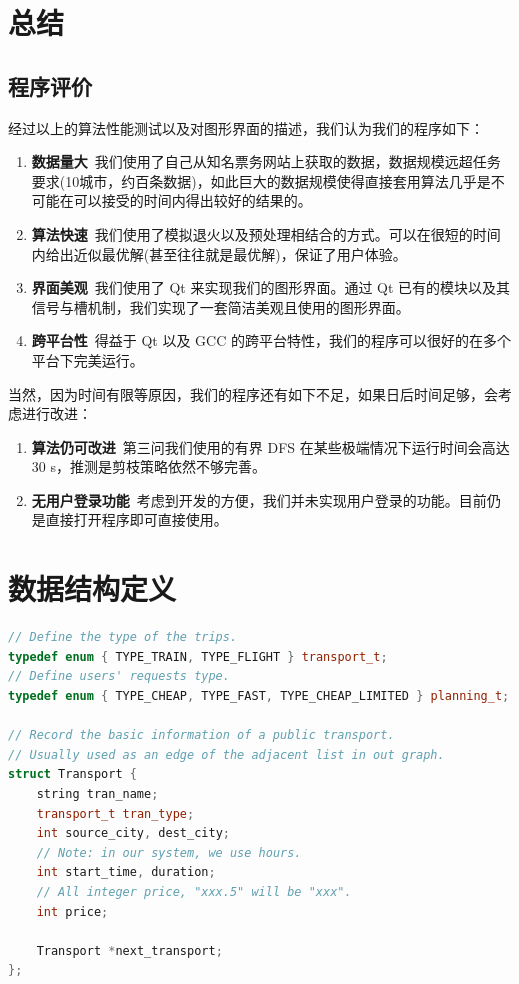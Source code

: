 \documentclass[lang=cn,blue]{elegantbook}
\begin{document}
\chapter{总结}

\section{程序评价}
经过以上的算法性能测试以及对图形界面的描述，我们认为我们的程序如下：

\begin{enumerate}
	\item \textbf{数据量大}\ 我们使用了自己从知名票务网站上获取的数据，数据规模远超任务要求(10城市，约百条数据)，如此巨大的数据规模使得直接套用算法几乎是不可能在可以接受的时间内得出较好的结果的。
	\item \textbf{算法快速}\ 我们使用了模拟退火以及预处理相结合的方式。可以在很短的时间内给出近似最优解(甚至往往就是最优解)，保证了用户体验。
	\item \textbf{界面美观}\ 我们使用了 Qt 来实现我们的图形界面。通过 Qt 已有的模块以及其信号与槽机制，我们实现了一套简洁美观且使用的图形界面。
	\item \textbf{跨平台性}\ 得益于 Qt 以及 GCC 的跨平台特性，我们的程序可以很好的在多个平台下完美运行。
\end{enumerate}

当然，因为时间有限等原因，我们的程序还有如下不足，如果日后时间足够，会考虑进行改进：

\begin{enumerate}
	\item \textbf{算法仍可改进}\ 第三问我们使用的有界 DFS 在某些极端情况下运行时间会高达 30 s，推测是剪枝策略依然不够完善。
	\item \textbf{无用户登录功能}\ 考虑到开发的方便，我们并未实现用户登录的功能。目前仍是直接打开程序即可直接使用。
\end{enumerate}

\appendix
\chapter{数据结构定义}

\begin{lstlisting}[language=C++,caption={Transport 的定义},captionpos=b]
// Define the type of the trips.
typedef enum { TYPE_TRAIN, TYPE_FLIGHT } transport_t;
// Define users' requests type.
typedef enum { TYPE_CHEAP, TYPE_FAST, TYPE_CHEAP_LIMITED } planning_t;

// Record the basic information of a public transport.
// Usually used as an edge of the adjacent list in out graph.
struct Transport {
	string tran_name;
	transport_t tran_type;
	int source_city, dest_city;
	// Note: in our system, we use hours.
	int start_time, duration;
	// All integer price, "xxx.5" will be "xxx".
	int price;

	Transport *next_transport;
};
\end{lstlisting}
\end{document}
